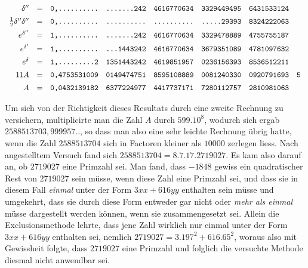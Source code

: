 \[\begin{array}{rcrlllll}
\delta''&=&\text{\ttfamily 0,..........}&\text{\ttfamily .......242}&\text{\ttfamily 4616770634}&\text{\ttfamily 3329449495}&\text{\ttfamily 6431533124}&\\[5pt]
\frac12\delta''\delta''&=&\text{\ttfamily 0,..........}&\text{\ttfamily ..........}&\text{\ttfamily ..........}&\text{\ttfamily .....29393}&\text{\ttfamily 8324222063}&\\[5pt]
e^{\delta''}&=&\text{\ttfamily 1,..........}&\text{\ttfamily .......242}&\text{\ttfamily 4616770634}&\text{\ttfamily 3329478889}&\text{\ttfamily 4755755187}&\\[5pt]
e^{\delta'}&=&\text{\ttfamily 1,..........}&\text{\ttfamily ...1443242}&\text{\ttfamily 4616770634}&\text{\ttfamily 3679351089}&\text{\ttfamily 4781097632}&\\[5pt]
e^\delta&=&\text{\ttfamily 1,.........2}&\text{\ttfamily 1351443242}&\text{\ttfamily 4619851957}&\text{\ttfamily 0236156393}&\text{\ttfamily 8536512211}&\\[5pt]
11A&=&\text{\ttfamily 0,4753531009}&\text{\ttfamily 0149474751}&\text{\ttfamily 8595108889}&\text{\ttfamily 0081240330}&\text{\ttfamily 0920791693}&\text{\ttfamily 5}\\[5pt]
A&=&\text{\ttfamily 0,0432139182}&\text{\ttfamily 6377224977}&\text{\ttfamily 4417737171}&\text{\ttfamily 7280112757}&\text{\ttfamily 2810981063}&
\end{array}
\]\endgroup

Um sich von der Richtigkeit dieses Resultats durch eine zweite Rechnung
zu versichern, multiplicirte man die Zahl $A$ durch $599.10^8$, wodurch sich ergab
$2588513703,999957..$, so dass man also eine sehr leichte Rechnung übrig hatte,
wenn die Zahl $2588513704$ sich in Factoren kleiner als $10000$ zerlegen liess.
Nach angestelltem Versuch fand sich $2588513704=8.7.17.2719027$. Es kam
also darauf an, ob $2719027$ eine Primzahl sei. Man fand, dass $-1848$ gewiss
ein quadratischer Rest von $2719027$ sein müsse, wenn diese Zahl eine Primzahl
sei, und dass sie in diesem Fall \textit{einmal} unter der Form $3xx+616yy$ enthalten
sein müsse und umgekehrt, dass sie durch diese Form entweder gar nicht oder
\textit{mehr als einmal} müsse dargestellt werden können, wenn sie zusammengesetzt sei.
Allein die Exclusionsmethode lehrte, dass jene Zahl wirklich nur einmal unter
der Form $3xx+616yy$ enthalten sei, nemlich $2719027=3.197^2+616.65^2$,
woraus also mit Gewissheit folgte, dass $2719027$ eine Primzahl und folglich die
versuchte Methode diesmal nicht anwendbar sei.

